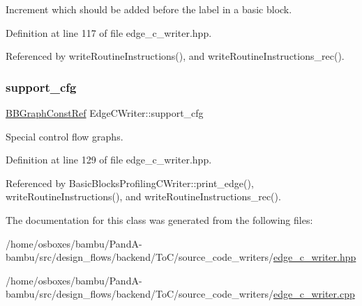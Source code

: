 Increment which should be added before the label in a basic block. 



Definition at line 117 of file edge\+\_\+c\+\_\+writer.\+hpp.



Referenced by write\+Routine\+Instructions(), and write\+Routine\+Instructions\+\_\+rec().

\mbox{\label{classEdgeCWriter_ab394651b6c31ee7b0dbd7552d506dfd3}} 
\subsubsection{\texorpdfstring{support\+\_\+cfg}{support\_cfg}}
{\footnotesize\ttfamily \hyperlink{basic__block_8hpp_ab66bdbde3a29e41d079d8a320af9c921}{B\+B\+Graph\+Const\+Ref} Edge\+C\+Writer\+::support\+\_\+cfg\hspace{0.3cm}{\ttfamily [protected]}}



Special control flow graphs. 



Definition at line 129 of file edge\+\_\+c\+\_\+writer.\+hpp.



Referenced by Basic\+Blocks\+Profiling\+C\+Writer\+::print\+\_\+edge(), write\+Routine\+Instructions(), and write\+Routine\+Instructions\+\_\+rec().



The documentation for this class was generated from the following files\+:\begin{DoxyCompactItemize}
\item 
/home/osboxes/bambu/\+Pand\+A-\/bambu/src/design\+\_\+flows/backend/\+To\+C/source\+\_\+code\+\_\+writers/\hyperlink{edge__c__writer_8hpp}{edge\+\_\+c\+\_\+writer.\+hpp}\item 
/home/osboxes/bambu/\+Pand\+A-\/bambu/src/design\+\_\+flows/backend/\+To\+C/source\+\_\+code\+\_\+writers/\hyperlink{edge__c__writer_8cpp}{edge\+\_\+c\+\_\+writer.\+cpp}\end{DoxyCompactItemize}
